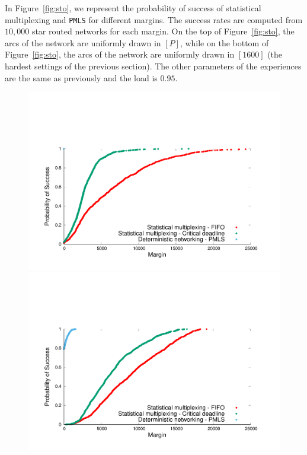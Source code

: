 \documentclass[a4paper,10pt]{journal}
\newcommand\PMLS{\texttt{PMLS}\xspace}
\begin{document}

     In Figure~\ref{fig:sto}, we represent the probability of success of statistical multiplexing and \PMLS for different margins. The success rates are computed from $10,000$ star routed networks for each margin. On the top of Figure~\ref{fig:sto}, the arcs of the network are uniformly drawn in $[P]$, while on the bottom of Figure~\ref{fig:sto}, the arcs of the network are uniformly drawn in $[1600]$ (the hardest settings of the previous section). The other parameters of the experiences are the same as previously and the load is $0.95$. 
     
    \begin{figure}


       \begin{center}
      \includegraphics[width = 0.9\linewidth]{stochasticdistrib.pdf}

     \includegraphics[width = 0.9\linewidth]{stochastic.pdf}


\end{center}
\end{figure}
\end{document}

